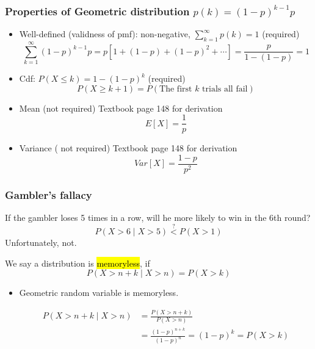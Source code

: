\documentclass[slidestop,compress,mathserif]{beamer}
\begin{document}
\begin{frame}\frametitle{Properties of Geometric distribution $p(k) = (1-p)^{k-1}p$}

\begin{itemize}
\item Well-defined (validness of pmf): non-negative, $\sum_{k = 1}^{\infty} p(k) = 1$  ({\color{red}required})\\
\pause\vspace{-0.3cm}
\[\sum_{k = 1}^{\infty}(1-p)^{k-1}p =  p[1 + (1-p) + (1-p)^2 + \cdots] = \frac{p}{1-(1-p)}=1 \]

\vspace{0.5cm}
\pause
\item Cdf: $P(X \leq k) = 1 - (1-p)^k$  ({\color{red}required})\\
\pause\vspace{-0.3cm}
\[ P(X \geq k + 1) = P(\text{The first } k \text{ trials all fail}) \]

\pause\item Mean ({\color{red}not required}) Textbook page 148 for derivation
\[E[X] = \frac{1}{p} \]

\pause\item Variance ({\color{red} not required}) Textbook page 148 for derivation
\[Var[X] = \frac{1-p}{p^2} \]
\end{itemize}

\end{frame}


\begin{frame}\frametitle{Gambler's fallacy}
If the gambler loses 5 times in a row, will he more likely to win in the 6th round?
\pause
\[
P(X > 6 \mid X > 5) \stackrel{?}{<} P(X > 1)
\]
\pause
Unfortunately, not.
\pause
\begin{defn}
We say a distribution is \hl{memoryless}, if
\[ P(X > n + k \mid X > n) = P(X > k)\]
\end{defn}

\pause
\begin{itemize}
\item Geometric random variable is memoryless.

\pause
\begin{align*}
P(X > n + k \mid X > n) %
& = \frac{P(X > n + k)}{P(X > n)} \\
& = \frac{(1-p)^{n+k}}{(1-p)^n} = (1-p)^k = P(X > k)
\end{align*}

\end{itemize}

\end{frame}
\end{document}

